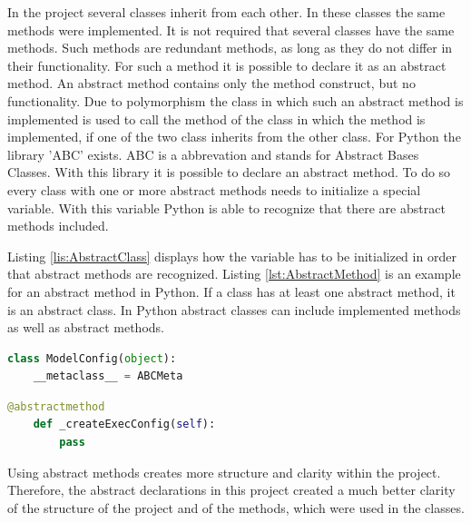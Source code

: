 In the project several classes inherit from each other. In these classes the same methods were implemented. It is not required that several classes have the same methods. Such methods are redundant methods, as long as they do not differ in their functionality. For such a method it is possible to declare it as an abstract method. An abstract method contains only the method construct, but no functionality. Due to polymorphism the class in which such an abstract method is implemented is used to call the method of the class in which the method is implemented, if one of the two class inherits from the other class. \newline
For Python the library 'ABC' exists. ABC is a abbrevation and stands for Abstract Bases Classes. With this library it is possible to declare an abstract method. To do so every class with one or more abstract methods needs to initialize a special variable. With this variable Python is able to recognize that there are abstract methods included. 

Listing \ref{lis:AbstractClass} displays how the variable has to be initialized in order that abstract methods are recognized. Listing \ref{lst:AbstractMethod} is an example for an abstract method in Python. If a class has at least one abstract method, it is an abstract class. In Python abstract classes can include implemented methods as well as abstract methods.

\begin{lstlisting}[language=Python, caption ={[Initialization of an class variable in order to use the library ABC] The initialization of a class variable which is required by Python in order to detect abstract methods and abstract classes.}, label = lis:AbstractClass]
class ModelConfig(object):
    __metaclass__ = ABCMeta
\end{lstlisting} 

\begin{lstlisting}[language=Python, caption ={[Declaration of an abstract method] Declaration of an abstract method.}, label=lst:AbstractMethod]
    @abstractmethod
    def _createExecConfig(self):
        pass
\end{lstlisting}
Using abstract methods creates more structure and clarity within the project. Therefore, the abstract declarations in this project created a much better clarity of the structure of the project and of the methods, which were used in the classes.

